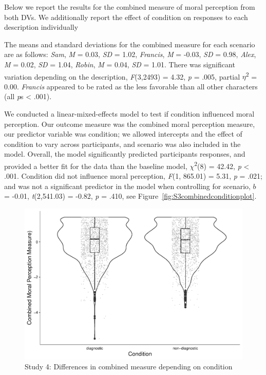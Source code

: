\documentclass[
  american,
  man,mask,floatsintext]{apa6}
\begin{document}
Below we report the results for the combined measure of moral perception from both DVs. We additionally report the effect of condition on responses to each description individually

The means and standard deviations for the combined measure for each scenario are as follows:
\emph{Sam},
\emph{M} = 0.03, \emph{SD} = 1.02,
\emph{Francis},
\emph{M} = -0.03, \emph{SD} = 0.98,
\emph{Alex},
\emph{M} = 0.02, \emph{SD} = 1.04,
\emph{Robin},
\emph{M} = 0.04, \emph{SD} = 1.01. There was significant variation depending on the description, \emph{F}(3,2493) = 4.32, \emph{p} = .005, partial \(\eta\)\textsuperscript{2} = 0.00. \emph{Francis} appeared to be rated as the less favorable than all other characters (all \emph{p}s \textless{} .001).

We conducted a linear-mixed-effects model to test if condition influenced moral perception. Our outcome measure was the combined moral perception measure, our predictor variable was condition; we allowed intercepts and the effect of condition to vary across participants, and scenario was also included in the model.
Overall, the model significantly predicted participants responses, and provided a better fit for the data than the baseline model, \(\chi\)\textsuperscript{2}(8) = 42.42, \emph{p} \textless{} .001. Condition did not influence moral perception, \emph{F}(1, 865.01) = 5.31, \emph{p} = .021; and was not a significant predictor in the model when controlling for scenario, \(b\) = -0.01, \emph{t}(2,541.03) = -0.82, \emph{p} = .410, see Figure~\ref{fig:S3combinedconditionplot}.

\begin{figure}[!h]
\includegraphics[width=\textwidth,]{Supplementary_files/figure-latex/S4combinedconditionplot-1} \caption{Study 4: Differences in combined measure depending on condition}\label{fig:S4combinedconditionplot}
\end{figure}
\end{document}
